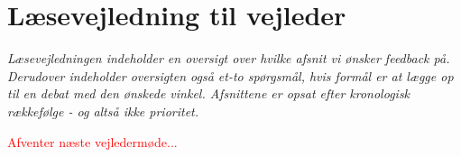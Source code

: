 
\chapter*{Læsevejledning til vejleder}

\textit{Læsevejledningen indeholder en oversigt over hvilke afsnit vi ønsker feedback på. Derudover indeholder oversigten også et-to spørgsmål, hvis formål er at lægge op til en debat med den ønskede vinkel. Afsnittene er opsat efter kronologisk rækkefølge - og altså ikke prioritet.}\bigskip

\noindent \textcolor{red}{Afventer næste vejledermøde...}